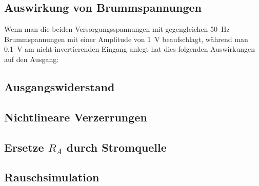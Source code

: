 \subsection{Auswirkung von Brummspannungen}
Wenn man die beiden Versorgungsspannungen mit gegengleichen \SI{50}{\hertz} Brummspannungen mit einer Amplitude von \SI{1}{\volt} beaufschlagt, während man \SI{0.1}{\volt} am nicht-invertierenden Eingang anlegt hat dies folgenden Auswirkungen auf den Ausgang:

\subsection{Ausgangswiderstand}

\subsection{Nichtlineare Verzerrungen}

\subsection{Ersetze $R_A$ durch Stromquelle}

\subsection{Rauschsimulation}



